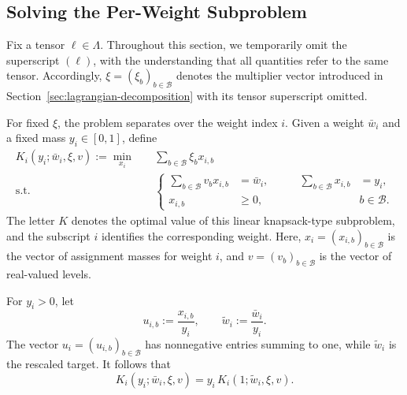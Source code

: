 \documentclass{article}
\begin{document}
\subsection{Solving the Per-Weight Subproblem}
\label{app:subproblem}
\label{app:per-weight-derivation}


Fix a tensor $\ell\in\Lambda$. Throughout this section, we temporarily omit
the superscript $(\ell)$, with the understanding that all quantities refer to
the same tensor. Accordingly, $\xi=(\xi_b)_{b\in\mathcal B}$ denotes the
multiplier vector introduced in Section~\ref{sec:lagrangian-decomposition}
with its tensor superscript omitted.

For fixed $\xi$, the problem separates over the weight index $i$. Given a
weight $\bar w_i$ and a fixed mass $y_i\in[0,1]$, define
\begin{align}
 K_i(y_i;\bar w_i,\xi,v)
 :=\min_{x_i}\quad&
 \sum_{b\in\mathcal B}\xi_bx_{i,b}
 \label{eq:knapsack-objective}\\
 \text{s.t.}\quad&
 \left\{
 \begin{aligned}
  \sum_{b\in\mathcal B}v_bx_{i,b}&=\bar w_i,
  &\qquad \sum_{b\in\mathcal B}x_{i,b}&=y_i,\\
  x_{i,b}&\geq0,
  && b\in\mathcal B.
 \end{aligned}
 \right.
 \label{eq:knapsack-constraints}
\end{align}
The letter $K$ denotes the optimal value of this linear knapsack-type
subproblem, and the subscript $i$ identifies the corresponding weight. Here,
$x_i=(x_{i,b})_{b\in\mathcal B}$ is the vector of assignment masses for weight
$i$, and $v=(v_b)_{b\in\mathcal B}$ is the vector of real-valued levels.

For $y_i>0$, let
\[
  u_{i,b}:=\frac{x_{i,b}}{y_i},
  \qquad
  \widetilde w_i:=\frac{\bar w_i}{y_i}.
\]
The vector $u_i=(u_{i,b})_{b\in\mathcal B}$ has nonnegative entries summing to
one, while $\widetilde w_i$ is the rescaled target. It follows that
\begin{equation}
  K_i(y_i;\bar w_i,\xi,v)
  =
  y_i\,K_i(1;\widetilde w_i,\xi,v).
  \label{eq:perspective-scaling}
\end{equation}
\end{document}
